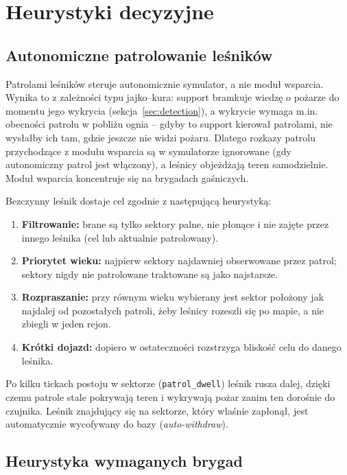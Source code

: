\section{Heurystyki decyzyjne}

\subsection{Autonomiczne patrolowanie leśników}
\label{sec:patrol-heuristic}

Patrolami leśników steruje autonomicznie symulator, a nie moduł wsparcia. Wynika to z zależności typu jajko–kura: support bramkuje wiedzę o pożarze do momentu jego wykrycia (sekcja~\ref{sec:detection}), a wykrycie wymaga m.in. obecności patrolu w pobliżu ognia -- gdyby to support kierował patrolami, nie wysłałby ich tam, gdzie jeszcze nie widzi pożaru. Dlatego rozkazy patrolu przychodzące z modułu wsparcia są w symulatorze ignorowane (gdy autonomiczny patrol jest włączony), a leśnicy objeżdżają teren samodzielnie. Moduł wsparcia koncentruje się na brygadach gaśniczych.

Bezczynny leśnik dostaje cel zgodnie z następującą heurystyką:

\begin{enumerate}
    \item \textbf{Filtrowanie:} brane są tylko sektory palne, nie płonące i nie zajęte przez innego leśnika (cel lub aktualnie patrolowany).
    \item \textbf{Priorytet wieku:} najpierw sektory najdawniej obserwowane przez patrol; sektory nigdy nie patrolowane traktowane są jako najstarsze.
    \item \textbf{Rozpraszanie:} przy równym wieku wybierany jest sektor położony jak najdalej od pozostałych patroli, żeby leśnicy rozeszli się po mapie, a nie zbiegli w jeden rejon.
    \item \textbf{Krótki dojazd:} dopiero w ostateczności rozstrzyga bliskość celu do danego leśnika.
\end{enumerate}

Po kilku tickach postoju w sektorze (\texttt{patrol\_dwell}) leśnik rusza dalej, dzięki czemu patrole stale pokrywają teren i wykrywają pożar zanim ten dorośnie do czujnika. Leśnik znajdujący się na sektorze, który właśnie zapłonął, jest automatycznie wycofywany do bazy (\textit{auto-withdraw}).

\subsection{Heurystyka wymaganych brygad}

